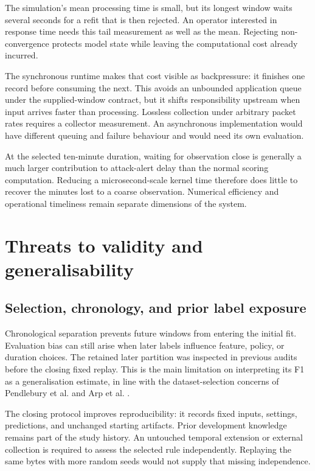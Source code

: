 The simulation's mean processing time is small, but its longest
window waits several seconds for a refit that is then rejected.
An operator interested in response time needs this tail measurement
as well as the mean. Rejecting non-convergence protects model
state while leaving the computational cost already incurred.

The synchronous runtime makes that cost visible as backpressure:
it finishes one record before consuming the next. This avoids an
unbounded application queue under the supplied-window contract, but
it shifts responsibility upstream when input arrives faster than
processing. Lossless collection under arbitrary packet rates requires a
collector measurement. An asynchronous implementation
would have different queuing and failure behaviour and would need
its own evaluation.

At the selected ten-minute duration, waiting for observation close
is generally a much larger contribution to attack-alert delay than
the normal scoring computation. Reducing a microsecond-scale kernel
time therefore does little to recover the minutes lost to a coarse
observation. Numerical efficiency and operational timeliness remain
separate dimensions of the system.

\section{Threats to validity and generalisability}
\label{sec:validity}

\subsection{Selection, chronology, and prior label exposure}

Chronological separation prevents future windows from entering the
initial fit. Evaluation bias can still arise when later labels influence
feature, policy, or duration choices. The retained
later partition was inspected in previous audits before the closing
fixed replay. This is the main limitation on interpreting its F1
as a generalisation estimate, in line with the dataset-selection
concerns of Pendlebury et al. and Arp et al.
\cite{pendlebury2019,arp2022}.

The closing protocol improves reproducibility: it records fixed
inputs, settings, predictions, and unchanged starting artifacts. Prior
development knowledge remains part of the study history. An untouched
temporal extension or external collection is required
to assess the selected rule independently. Replaying the same bytes
with more random seeds would not supply that missing independence.

